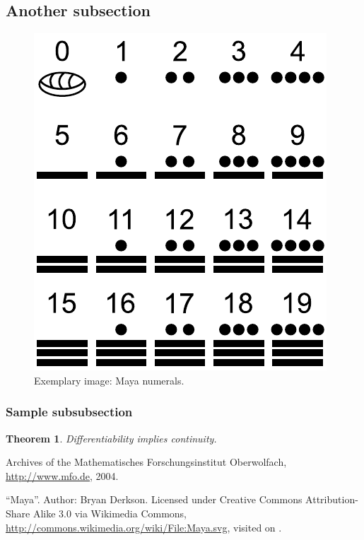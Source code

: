 \documentclass{snapshotmfo}
\begin{document}
\subsection{Another subsection} \label{subsec:another}

\begin{figure}[ht]
	\centering
	\includegraphics[width= 0.33 \textwidth]{maya.pdf}
	\caption{Exemplary image: Maya numerals.}
	\label{fig:maya}
\end{figure}

\subsubsection{Sample subsubsection} \label{subsubsec:sample}

\newtheorem{theorem}{Theorem}
\begin{theorem}\label{thm:continuity}
	Differentiability implies continuity.
\end{theorem}



\begin{imagecredits}
	\item[\Cref{fig:Institute}] Archives of the Mathematisches Forschungsinstitut Oberwolfach,\\\url{http://www.mfo.de}, 2004.
	\item[\Cref{fig:maya}] ``Maya''. Author: Bryan Derkson. Licensed under Creative Commons Attribution-Share Alike 3.0 via Wikimedia Commons, \url{http://commons.wikimedia.org/wiki/File:Maya.svg}, visited on .
\end{imagecredits}
\end{document}
